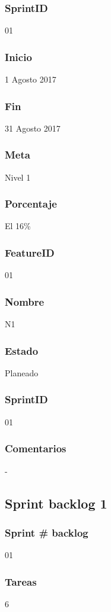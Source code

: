 \subsubsection{SprintID}
01
\subsubsection{Inicio}
1 Agosto 2017
\subsubsection{Fin}
31 Agosto 2017
\subsubsection{Meta}
Nivel 1
\subsubsection{Porcentaje}
El 16\% 


\subsubsection{FeatureID}
01
\subsubsection{Nombre}
N1
\subsubsection{Estado}
Planeado

\subsubsection{SprintID}
01
\subsubsection{Comentarios}
-


\subsection{Sprint backlog 1}
\subsubsection{Sprint # backlog}
01

\subsubsection{Tareas}
6
